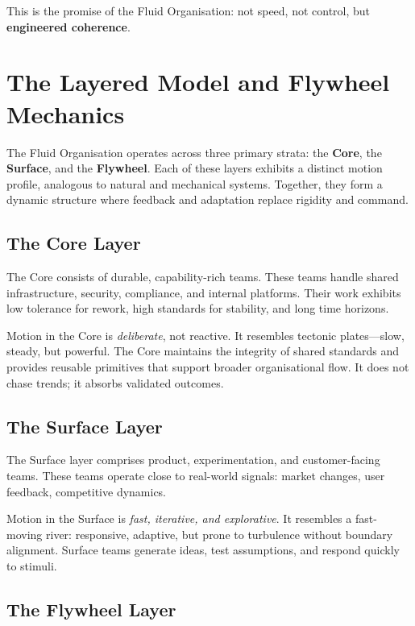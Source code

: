 \documentclass[12pt]{article}
\begin{document}
This is the promise of the Fluid Organisation: not speed, not control, but \textbf{engineered coherence}.

\section{The Layered Model and Flywheel Mechanics}

The Fluid Organisation operates across three primary strata: the \textbf{Core}, the \textbf{Surface}, and the \textbf{Flywheel}. Each of these layers exhibits a distinct motion profile, analogous to natural and mechanical systems. Together, they form a dynamic structure where feedback and adaptation replace rigidity and command.

\subsection*{The Core Layer}

The Core consists of durable, capability-rich teams. These teams handle shared infrastructure, security, compliance, and internal platforms. Their work exhibits low tolerance for rework, high standards for stability, and long time horizons.

Motion in the Core is \textit{deliberate}, not reactive. It resembles tectonic plates---slow, steady, but powerful. The Core maintains the integrity of shared standards and provides reusable primitives that support broader organisational flow. It does not chase trends; it absorbs validated outcomes.

\subsection*{The Surface Layer}

The Surface layer comprises product, experimentation, and customer-facing teams. These teams operate close to real-world signals: market changes, user feedback, competitive dynamics.

Motion in the Surface is \textit{fast, iterative, and explorative}. It resembles a fast-moving river: responsive, adaptive, but prone to turbulence without boundary alignment. Surface teams generate ideas, test assumptions, and respond quickly to stimuli.

\subsection*{The Flywheel Layer}
\end{document}

